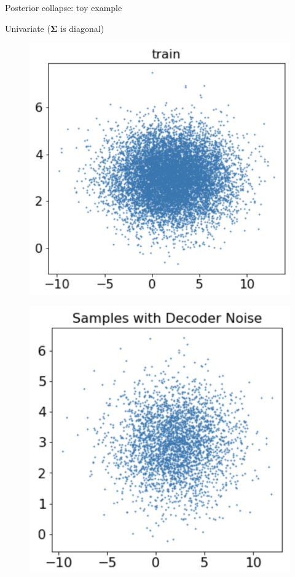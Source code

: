\documentclass{beamer}
\newcommand{\bSigma}{\boldsymbol{\Sigma}}
\begin{document}
\begin{frame}{Posterior collapse: toy example}
	\begin{block}{Univariate ($\bSigma$ is diagonal)}
		\vspace{-0.5cm}
		\begin{minipage}[t]{0.33\columnwidth}
		\begin{figure}[h]
			\centering
			\includegraphics[width=.8\linewidth]{figs/posterior_collapse_toy_2.png}
		\end{figure}
		\end{minipage}%
		\begin{minipage}[t]{0.33\columnwidth}
		\begin{figure}[h]
			\centering
			\includegraphics[width=.75\linewidth]{figs/posterior_collapse_toy_4.png}

\end{figure}
\end{minipage}
\end{block}
\end{frame}
\end{document}
